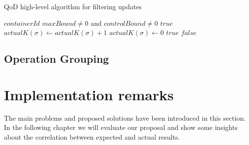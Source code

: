 \begin{algorithm*}
\caption{QoD high-level algorithm for filtering updates}
\label{algo1}
\begin{algorithmic}[1]
\REQUIRE $containerId$
\ENSURE $maxBound \neq 0$ and $controlBound \neq 0$
\RETURN $true$
\STATE $actualK(\sigma) \leftarrow actualK(\sigma)+1$
	\STATE $actualK(\sigma) \leftarrow 0$
	\RETURN $true$
	\ELSE
	\RETURN $false$
	\ENDIF
\ENDIF
\ENDWHILE
\end{algorithmic}
\end{algorithm*}

\subsection{Operation Grouping}\label{grouping}
 




\section{Implementation remarks}\label{summary-implementation}
The main problems and proposed solutions have been introduced in this section. In the following chapter we will evaluate our proposal and show some insights about the correlation between expected and actual results.

